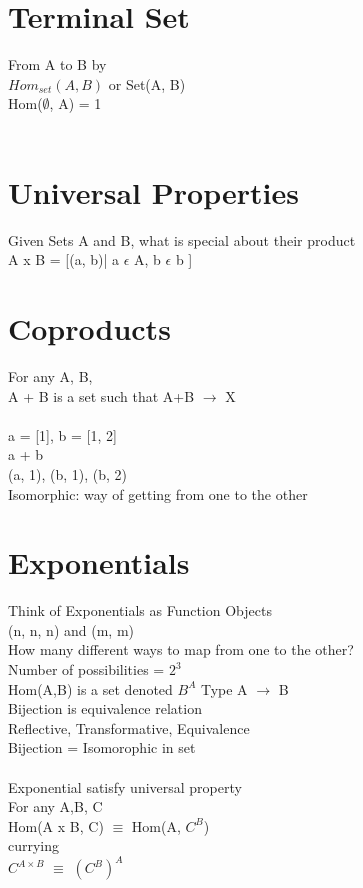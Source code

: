 \documentclass{article}
\begin{document}
\section{Terminal Set}
From A to B by 
\\
$Hom_{set}(A, B)$ or Set(A, B)
\\
Hom($\emptyset$, A) = 1
\\
\\
\section{Universal Properties}
Given Sets A and B, what is special about their product
\\
A x B = [(a, b)| a $\epsilon$ A, b $\epsilon$ b ]
\\
\section{Coproducts}
For any A, B,
\\
A + B is a set such that A+B $\rightarrow$ X
\\
\\
a = [1], b = [1, 2]
\\
a + b
\\
(a, 1), (b, 1), (b, 2)
\\
Isomorphic: way of getting from one to the other
\\
\section{Exponentials}
Think of Exponentials as Function Objects
\\
(n, n, n) and (m, m)
\\
How many different ways to map from one to the other? 
\\
Number of possibilities = $2^{3}$
\\
Hom(A,B) is a set denoted
$B^{A}$
Type A $\rightarrow$ B
\\
Bijection is equivalence relation
\\
Reflective, Transformative, Equivalence
\\
Bijection = Isomorophic in set
\\
\\
Exponential satisfy universal property
\\
For any A,B, C
\\
Hom(A x B, C) $\equiv$ Hom(A, $C^{B}$)
\\
currying
\\
$C^{A \times B}$ $\equiv$ $(C^{B})^{A}$
\\
\\
\end{document}
